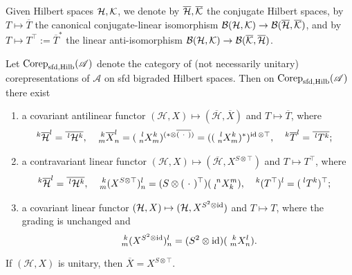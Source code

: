 Given Hilbert spaces $\Hsp,\mathcal{K}$, we denote by $\overline{\Hsp},\overline{\mathcal{K}}$
the conjugate Hilbert spaces, by $T \mapsto \overline{T}$ the
canonical conjugate-linear isomorphism $\mathcal{B}(\Hsp,\mathcal{K}) \to
\mathcal{B}(\overline{\Hsp},\overline{\mathcal{K}})$, and by $T \mapsto
T^{\top}:=\overline{T}^{*}$ the linear anti-isomorphism %
$\mathcal{B}(\Hsp,\mathcal{K}) \to \mathcal{B}(\overline{\mathcal{K}},\overline{\Hsp})$.

\begin{Lem} \label{lemma:rep-functors}Let $\Corep_{\sfd,\Hilb}(\mathscr{A})$ denote the category of (not necessarily unitary) corepresentations of $\mathscr{A}$ on sfd bigraded Hilbert spaces. 
   Then on $\Corep_{\sfd,\Hilb}(\mathscr{A})$ there exist
  \begin{enumerate}
  \item a covariant antilinear functor $(\mathcal{H},X) \mapsto
    (\overline{\mathcal{H}},\overline{X})$ and $T \mapsto
    \overline{T}$, where
    \begin{align*}
      \Gru{\overline{\mathcal{H}}}{k}{l} &= \overline{\Gru{\mathcal{H}}{l}{k}},
      & \Gr{\overline{X}}{k}{l}{m}{n} &= (\Gr{X}{l}{k}{n}{m})^{(*
        \otimes \overline{(\ \cdot \ ) })}
      =((\Gr{X}{l}{k}{n}{m})^{*})^{\id \otimes \top}, &
      \Gru{\overline{T}}{k}{l} &= \overline{\Gru{T}{l}{k}};
    \end{align*}
  \item a contravariant linear functor $(\mathcal{H},X) \mapsto
    (\overline{\mathcal{H}},X^{S\otimes \top})$ and
    $T\mapsto T^{\top}$, where 
    \begin{align*}\Gru{\overline{\mathcal{H}}}{k}{l} &= \overline{\Gru{\mathcal{H}}{l}{k}},&
     & \Gr{(X^{S\otimes \top})}{k}{l}{m}{n} = (S \otimes (\ \cdot \
      )^{\top})(\Gr{X}{n}{m}{l}{k}), & \Gru{(T^{\top})}{k}{l}
      &=(\Gru{T}{l}{k})^{\top};
    \end{align*}
  \item a covariant linear functor  $(\mathcal{H},X) \mapsto (\mathcal{H},X^{S^{2}\otimes \id})$
    and $T\mapsto T$, where the grading is unchanged and \[\Gr{(X^{S^{2}\otimes \id})}{k}{l}{m}{n}=(S^{2} \otimes
  \id)(\Gr{X}{k}{l}{m}{n}).\]
  \end{enumerate}
  If $(\mathcal{H},X)$ is unitary, then $\overline{X}=X^{S\otimes \top}$.\end{Lem}
